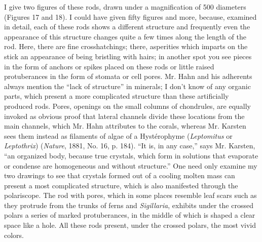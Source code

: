 \documentclass[a4paper, 12pt, oneside]{article}
\begin{document}
I give two figures of these rods, drawn under a magnification of 500 diameters (Figures 17 and 18). I could have given fifty figures and more, because, examined in detail, each of these rods shows a different structure and frequently even the appearance of this structure changes quite a few times along the length of the rod. Here, there are fine crosshatchings; there, asperities which imparts on the stick an appearance of being bristling with hairs; in another spot you see pieces in the form of anchors or spikes placed on these rods or little raised protuberances in the form of stomata or cell pores. Mr. Hahn and his adherents always mention the ``lack of structure'' in minerals; I don't know of any organic parts, which present a more complicated structure than these artificially produced rods. Pores, openings on the small columns of chondrules, are equally invoked as obvious proof that lateral channels divide these locations from the main channels, which Mr. Hahn attributes to the corals, whereas Mr. Karsten sees them instead as filaments of algae of a Hystérophyme (\emph{Leptomitus} or \emph{Leptothrix}) (\emph{Nature}, 1881, No. 16, p. 184). ``It is, in any case,'' says Mr. Karsten, ``an organized body, because true crystals, which form in solutions that evaporate or condense are homogeneous and without structure.'' One need only examine my two drawings to see that crystals formed out of a cooling molten mass can present a most complicated structure, which is also manifested through the polariscope. The rod with pores, which in some places resemble leaf scars such as they protrude from the trunks of ferns and \emph{Sigillaria}, exhibits under the crossed polars a series of marked protuberances, in the middle of which is shaped a clear space like a hole. All these rods present, under the crossed polars, the most vivid colors.
\end{document}
